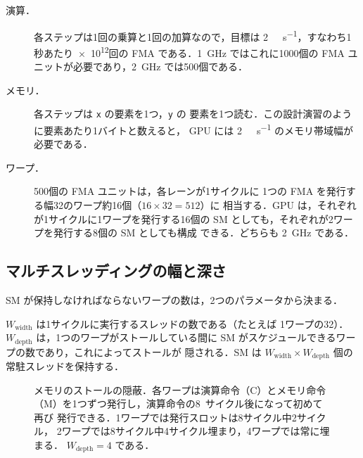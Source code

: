 \documentclass[../main.tex]{subfiles}
\begin{document}
\begin{description}
  \item[演算．]  各ステップは1回の乗算と1回の加算なので，目標は
    \SI{2}{\tera\flop\per\second}，すなわち1秒あたり\num{e12}回の
    FMA である．\SI{1}{\giga\hertz} ではこれに\num{1000}個の FMA
    ユニットが必要であり，\SI{2}{\giga\hertz} では\num{500}個である．
  \item[メモリ．]  各ステップは \texttt{x} の要素を1つ，\texttt{y} の
    要素を1つ読む．この設計演習のように要素あたり1バイトと数えると，
    GPU には \SI{2}{\tera\byte\per\second} のメモリ帯域幅が必要である．
  \item[ワープ．]  \num{500}個の FMA ユニットは，各レーンが1サイクルに
    1つの FMA を発行する幅32のワープ約16個（$16 \times 32 = 512$）に
    相当する．GPU は，それぞれが1サイクルに1ワープを発行する16個の
    SM としても，それぞれが2ワープを発行する8個の SM としても構成
    できる．どちらも \SI{2}{\giga\hertz} である．
\end{description}

\subsection{マルチスレッディングの幅と深さ}

SM が保持しなければならないワープの数は，2つのパラメータから決まる．

\begin{definition}
  \label{def:l08-wwidth-wdepth}
  $W_{\text{width}}$ は1サイクルに実行するスレッドの数である（たとえば
  1ワープの32）．$W_{\text{depth}}$ は，1つのワープがストールしている間に
  SM がスケジュールできるワープの数であり，これによってストールが
  隠される．SM は $W_{\text{width}} \times W_{\text{depth}}$ 個の
  常駐スレッドを保持する．
\end{definition}

\begin{figure}[tb]
  \centering
  
  \caption{メモリのストールの隠蔽．各ワープは演算命令（C）とメモリ命令
    （M）を1つずつ発行し，演算命令の8~サイクル後になって初めて再び
    発行できる．1ワープでは発行スロットは8サイクル中2サイクル，
    2ワープでは8サイクル中4サイクル埋まり，4ワープでは常に埋まる．
    $W_{\text{depth}} = 4$ である．}
  \label{fig:l08-wdepth}
\end{figure}
\end{document}
